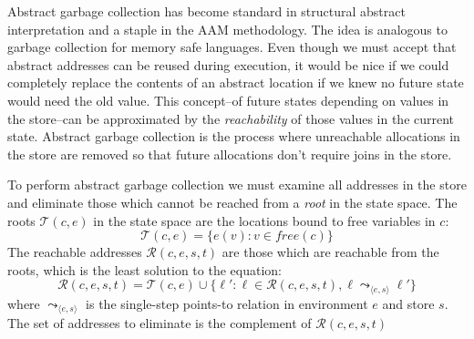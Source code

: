Abstract garbage collection has become standard in structural abstract
interpretation and a staple in the AAM methodology.
%
The idea is analogous to garbage collection for memory safe languages.
%
Even though we must accept that abstract addresses can be reused during
execution, it would be nice if we could completely replace the contents of an
abstract location if we knew no future state would need the old value.
%
This concept--of future states depending on values in the store--can be
approximated by the \textit{reachability} of those values in the current state.
%
Abstract garbage collection is the process where unreachable allocations in the
store are removed so that future allocations don't require joins in the store.


To perform abstract garbage collection we must examine all addresses in the
store and eliminate those which cannot be reached from a \textit{root} in the
state space.
%
The roots $\mathcal{T}(c,e)$ in the state space are the locations bound to free
variables in $c$:
%
\begin{equation*}
\mathcal{T}(c,e) = \{e(v) : v \in free(c)\}
\end{equation*}
%
The reachable addresses $\mathcal{R}(c,e,s,t)$ are those which are reachable
from the roots, which is the least solution to the equation:
%
\begin{equation*}
\mathcal{R}(c,e,s,t) = \mathcal{T}(c,e) 
                  \cup \{ \ell' 
                        : \ell \in \mathcal{R}(c,e,s,t)
                        , \ell \leadsto_{\langle e,s \rangle} \ell'
                       \}
\end{equation*}
where $\leadsto_{\langle e,s \rangle}$ is the single-step points-to relation
in environment $e$ and store $s$.
%
The set of addresses to eliminate is the complement of $\mathcal{R}(c,e,s,t)$
